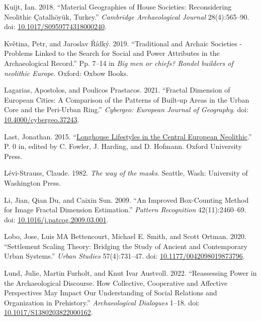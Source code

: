\documentclass[
  12pt,
]{book}
\newlength{\cslhangindent}
\newlength{\cslentryspacingunit} %
\newenvironment{CSLReferences}[2] %
 {%
  \setlength{\parindent}{0pt}
  \ifodd #1
  \let\oldpar\par
  \def\par{\hangindent=\cslhangindent\oldpar}
  \fi
  \setlength{\parskip}{#2\cslentryspacingunit}
 }%
 {}
\begin{document}
\begin{CSLReferences}{1}{0}
\leavevmode{}%
Kuijt, Ian. 2018. {``Material Geographies of House Societies: Reconsidering Neolithic Çatalhöyük, Turkey.''} \emph{Cambridge Archaeological Journal} 28(4):565--90. doi: \href{https://doi.org/10.1017/S0959774318000240}{10.1017/S0959774318000240}.

\leavevmode{}%
Květina, Petr, and Jaroslav Řídký. 2019. {``Traditional and Archaic Societies - Problems Linked to the Search for Social and Power Attributes in the Archaeological Record.''} Pp. 7--14 in \emph{Big men or chiefs? {Rondel} builders of neolithic {Europe}}. {Oxford}: {Oxbow Books}.

\leavevmode{}%
Lagarias, Apostolos, and Poulicos Prastacos. 2021. {``Fractal Dimension of European Cities: A Comparison of the Patterns of Built-up Areas in the Urban Core and the Peri-Urban Ring.''} \emph{Cybergeo: European Journal of Geography}. doi: \href{https://doi.org/10.4000/cybergeo.37243}{10.4000/cybergeo.37243}.

\leavevmode{}%
Last, Jonathan. 2015. {``\href{https://doi.org/10.1093/oxfordhb/9780199545841.013.009}{Longhouse Lifestyles in the Central European Neolithic}.''} P. 0 in, edited by C. Fowler, J. Harding, and D. Hofmann. Oxford University Press.

\leavevmode{}%
Lévi-Strauss, Claude. 1982. \emph{The way of the masks}. Seattle, Wash: University of Washington Press.

\leavevmode{}%
Li, Jian, Qian Du, and Caixin Sun. 2009. {``An Improved Box-Counting Method for Image Fractal Dimension Estimation.''} \emph{Pattern Recognition} 42(11):2460--69. doi: \href{https://doi.org/10.1016/j.patcog.2009.03.001}{10.1016/j.patcog.2009.03.001}.

\leavevmode{}%
Lobo, Jose, Luis MA Bettencourt, Michael E. Smith, and Scott Ortman. 2020. {``Settlement Scaling Theory: Bridging the Study of Ancient and Contemporary Urban Systems.''} \emph{Urban Studies} 57(4):731--47. doi: \href{https://doi.org/10.1177/0042098019873796}{10.1177/0042098019873796}.

\leavevmode{}%
Lund, Julie, Martin Furholt, and Knut Ivar Austvoll. 2022. {``Reassessing Power in the Archaeological Discourse. How Collective, Cooperative and Affective Perspectives May Impact Our Understanding of Social Relations and Organization in Prehistory.''} \emph{Archaeological Dialogues} 1--18. doi: \href{https://doi.org/10.1017/S1380203822000162}{10.1017/S1380203822000162}.


\end{CSLReferences}
\end{document}
